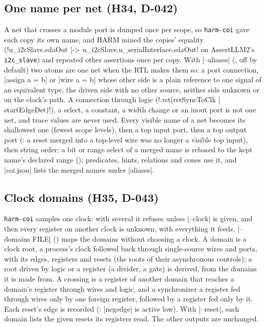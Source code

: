 \subsection{One name per net (H34, D-042)}\label{sec:aliases}
A net that crosses a module port is dumped once per scope, so \texttt{harm-coi} gave each copy its own name, and HARM mined the copies' equality (\code!u_i2cSlave.sdaOut |-> u_i2cSlave.u_serialInterface.sdaOut! on AssertLLM2's \texttt{i2c\_slave}) and repeated other assertions once per copy. With \code|--aliases| (, off by default) two atoms are one net when the RTL makes them so: a port connection, \code|assign a = b| or \code|wire a = b| whose other side is a plain reference to one signal of an equivalent type, the driven side with no other source, neither side unknown or on the clock's path. A connection through logic (\code!.rst(rstSyncToClk | startEdgeDet)!), a select, a constant, a width change or an inout port is not one net, and trace values are never used. Every visible name of a net becomes its shallowest one (fewest scope levels), then a top input port, then a top output port (: a reset merged into a top-level wire was no longer a visible top input), then string order; a bit or range select of a merged name is rebased to the kept name's declared range (); predicates, hints, relations and cones use it, and \code|coi.json| lists the merged names under \code|aliases|.

\subsection{Clock domains (H35, D-043)}\label{sec:domains}
\texttt{harm-coi} samples one clock: with several it refuses unless \code|--clock| is given, and then every register on another clock is unknown, with everything it feeds. \code|--domains FILE| () maps the domains without choosing a clock. A domain is a clock root, a process's clock followed back through single-source wires and ports, with its edges, registers and resets (the roots of their asynchronous controls); a root driven by logic or a register (a divider, a gate) is derived, from the domains it is made from. A crossing is a register of another domain that reaches a domain's register through wires and logic, and a synchronizer a register fed through wires only by one foreign register, followed by a register fed only by it. Each reset's edge is recorded (: \code|negedge| is active low). With \code|--reset|, each domain lists the given resets its registers read. The other outputs are unchanged.

